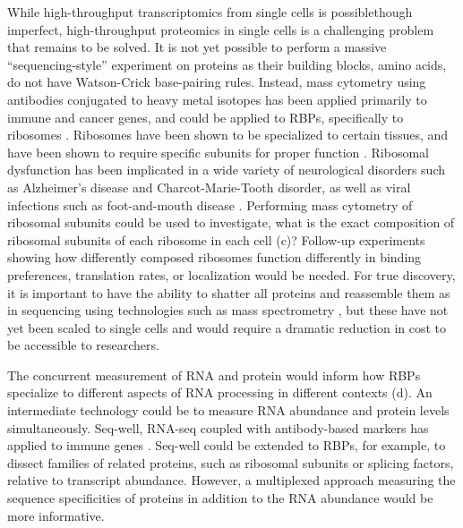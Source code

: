 While high-throughput transcriptomics from single cells is possible\linebreak though imperfect, high-throughput proteomics in single cells is a challenging problem that remains to be solved. It is not yet possible to perform a massive ``sequencing-style'' experiment on proteins as their building blocks, amino acids, do not have Watson-Crick base-pairing rules. Instead, mass cytometry \cite{Chen2012-gb,Giesen2014-eb,Irish2006-qt,Spitzer2016-nt,Wu2012-dt} using antibodies conjugated to heavy metal isotopes has been applied primarily to immune and cancer genes, and could be applied to RBPs, specifically to ribosomes \cite{Wilson2012-zv}. Ribosomes have been shown to be specialized to certain tissues, and have been shown to require specific subunits for proper function \cite{Brombin2015-cw,Buszczak2014-yq,Shi2015-fh,Signer2014-zw,Gilbert2011-nr,Xue2012-fb}. Ribosomal dysfunction has been implicated in a wide variety of neurological disorders such as Alzheimer's disease and Charcot-Marie-Tooth disorder, as well as viral infections such as foot-and-mouth disease \cite{Ding2005-sr,Freed2010-dm}. Performing mass cytometry of ribosomal subunits could be used to investigate, what is the exact composition of ribosomal subunits of each ribosome in each cell (c)? Follow-up experiments showing how differently composed ribosomes function differently in binding preferences, translation rates, or localization would be needed. For true discovery, it is important to have the ability to shatter all proteins and reassemble them as in sequencing using technologies such as mass spectrometry \cite{Aebersold2003-yi,Wilhelm2014-tt}, but these have not yet been scaled to single cells and would require a dramatic reduction in cost to be accessible to researchers.

The concurrent measurement of RNA and protein would inform how RBPs specialize to different aspects of RNA processing in different contexts (d). An intermediate technology could be to measure RNA abundance and protein levels simultaneously. Seq-well, RNA-seq coupled with antibody-based markers has applied to immune genes \cite{Gierahn2017-ko}. Seq-well could be extended to RBPs, for example, to dissect families of related proteins, such as ribosomal subunits or splicing factors, relative to transcript abundance. However, a multiplexed approach measuring the sequence specificities of proteins in addition to the RNA abundance would be more informative.

